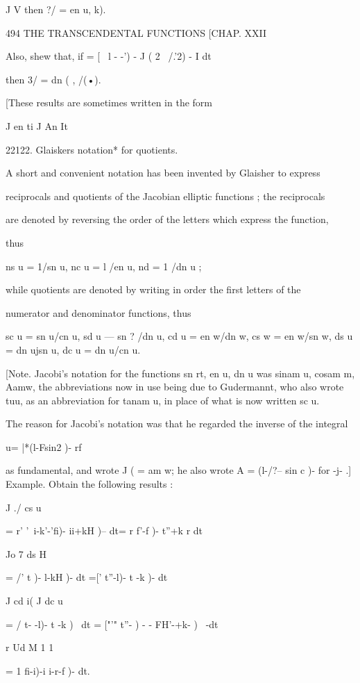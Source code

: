 J V 
then ?/ = en  u, k). 



494 THE TRANSCENDENTAL FUNCTIONS [CHAP. XXII 

Also, shew that, if   = [ \ l -  -') - J ( 2 \  /.'2) - I dt  

then 3/ = dn ( , /(•). 

[These results are sometimes written in the form 

J en ti J An It 

22122. Glaiskers notation* for quotients. 

A short and convenient notation has been invented by Glaisher to express 

reciprocals and quotients of the Jacobian elliptic functions ; the reciprocals 

are denoted by reversing the order of the letters which express the function, 

thus 

ns u = 1/sn u, nc u = l /en u, nd   = 1 /dn u ; 

while quotients are denoted by writing in order the first letters of the 

numerator and denominator functions, thus 

sc u = sn u/cn u, sd u — sn ? /dn u, cd u = en w/dn w, 
cs w = en w/sn w, ds u = dn ujsn u, dc u = dn u/cn u. 

[Note. Jacobi's notation for the functions sn rt, en u, dn u was sinam u, cosam m, 
Aamw, the abbreviations now in use being due to Gudermannt, who also wrote tuu, 
as an abbreviation for tanam u, in place of what is now written sc u. 

The reason for Jacobi's notation was that he regarded the inverse of the integral 

u= |*(l-Fsin2 )- rf  

as fundamental, and wrote J (  = am w; he also wrote A  = (l-/?-- sin c )- for -j- .] 
Example. Obtain the following results : 

J ./ cs u 

= r' '\ i-k'-'fi)- ii+kH )--  dt= r  f'-f )- t''+k r dt 

Jo 7 ds H 

= /'   t )-  l-kH )- dt =['  t''-l)-  t -k )- dt 

J cd i( J dc u 

= /  t- -l)-  t -k )~ dt = ["'"  t''- ) - - FH'-+k- )~ -dt 

r Ud M 1 1 

= 1  fi-i)-i i-r-f )- dt. 

